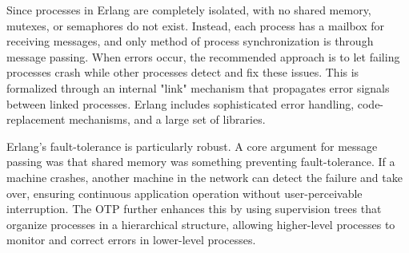 \documentclass[]{project_interim}
\begin{document}
Since processes in Erlang are completely isolated, with no shared memory, mutexes,
or semaphores do not exist. Instead, each process has a mailbox for receiving messages,
and only method of process synchronization is through message passing.
When errors occur, the recommended approach is to let failing processes
crash while other processes detect and fix these issues. \cite{armstrong_erlang_2010}
This is formalized
through an internal "link" mechanism that propagates error signals between
linked processes. Erlang includes sophisticated error handling, code-replacement
mechanisms, and a large set of libraries.\cite{armstrong_erlang_2010}

Erlang's fault-tolerance is particularly robust.
A core argument for message passing was that shared memory was something
preventing fault-tolerance.\cite{armstrong_erlang_2010}
If a machine crashes, another
machine in the network can detect the failure and take over, ensuring continuous
application operation without user-perceivable interruption. The OTP further
enhances this by using supervision trees that
organize processes in a hierarchical structure, allowing higher-level processes
to monitor and correct errors in lower-level processes. \cite{armstrong_erlang_2010}
\end{document}
